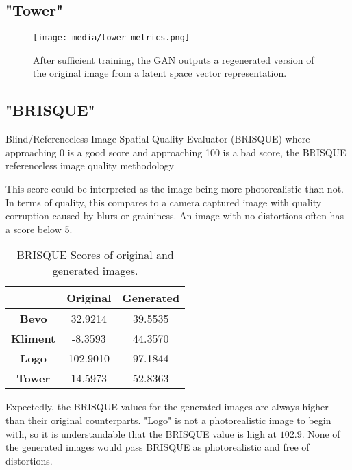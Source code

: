 \subsection{"Tower"}

\begin{figure}[H]
        \begin{center}
        \texttt{[image: media/tower\_metrics.png]}
        \end{center}
        \caption["Tower" Established Metrics]{After sufficient training, the GAN outputs a regenerated
        version of the original image from a latent space vector representation.}
        \end{figure}

\subsection{"BRISQUE"}

Blind/Referenceless Image Spatial Quality Evaluator (BRISQUE)
where approaching 0 is a good score and approaching 100 is a bad score, the BRISQUE referenceless 
image quality methodology

This score could be interpreted as the image being more photorealistic than not. 
In terms of quality, this compares to a camera captured image with quality corruption 
caused by blurs or graininess. An image with no distortions often has a score below 5.

\begin{table}[H]
    \begin{center}
    \begin{tabular}{|c|c|c|}
    \hline
      & Original & Generated \\ [0.5ex] 
    \hline\hline
    \textbf{Bevo}	& 32.9214 & 39.5535\\
    \textbf{Kliment}	& -8.3593 & 44.3570\\
    \textbf{Logo}	& 102.9010 & 97.1844\\
    \textbf{Tower} & 14.5973 & 52.8363\\\hline
    
    \end{tabular}
    \caption[BRISQUE]{BRISQUE Scores of original and generated images.}
    \end{center}
    \end{table}

Expectedly, the BRISQUE values for the generated images are always higher than
their original counterparts. "Logo" is not a photorealistic image to begin with, 
so it is understandable that the BRISQUE value is high at $102.9$.
None of the generated images would pass BRISQUE as photorealistic and free of 
distortions.  

